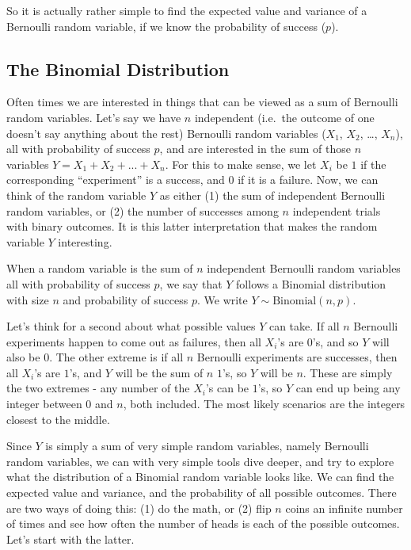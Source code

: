 \documentclass[]{book}
\theoremstyle{definition}
\theoremstyle{definition}
\theoremstyle{definition}
\theoremstyle{remark}
\begin{document}
So it is actually rather simple to find the expected value and variance of a Bernoulli random variable, if we know the probability of success (\(p\)).

\hypertarget{the-binomial-distribution}{%
\subsection{The Binomial Distribution}\label{the-binomial-distribution}}

Often times we are interested in things that can be viewed as a sum of Bernoulli random variables. Let's say we have \(n\) independent (i.e.~the outcome of one doesn't say anything about the rest) Bernoulli random variables (\(X_1\), \(X_2\), \ldots, \(X_n\)), all with probability of success \(p\), and are interested in the sum of those \(n\) variables \(Y = X_1 + X_2 + ... + X_n\). For this to make sense, we let \(X_i\) be \(1\) if the corresponding ``experiment'' is a success, and \(0\) if it is a failure. Now, we can think of the random variable \(Y\) as either (1) the sum of independent Bernoulli random variables, or (2) the number of successes among \(n\) independent trials with binary outcomes. It is this latter interpretation that makes the random variable \(Y\) interesting.

When a random variable is the sum of \(n\) independent Bernoulli random variables all with probability of success \(p\), we say that \(Y\) follows a Binomial distribution with size \(n\) and probability of success \(p\). We write \(Y \sim \text{Binomial}(n,p)\).

Let's think for a second about what possible values \(Y\) can take. If all \(n\) Bernoulli experiments happen to come out as failures, then all \(X_i\)'s are \(0\)'s, and so \(Y\) will also be \(0\). The other extreme is if all \(n\) Bernoulli experiments are successes, then all \(X_i\)'s are \(1\)'s, and \(Y\) will be the sum of \(n\) \(1\)'s, so \(Y\) will be \(n\). These are simply the two extremes - any number of the \(X_i\)'s can be \(1\)'s, so \(Y\) can end up being any integer between \(0\) and \(n\), both included. The most likely scenarios are the integers closest to the middle.

Since \(Y\) is simply a sum of very simple random variables, namely Bernoulli random variables, we can with very simple tools dive deeper, and try to explore what the distribution of a Binomial random variable looks like. We can find the expected value and variance, and the probability of all possible outcomes. There are two ways of doing this: (1) do the math, or (2) flip \(n\) coins an infinite number of times and see how often the number of heads is each of the possible outcomes. Let's start with the latter.
\end{document}
